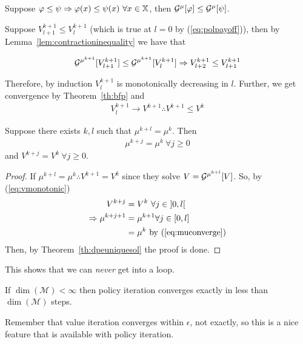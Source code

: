 \begin{lemma}%
\label{lem:contractioninequality}
Suppose $\varphi\leq\psi \Rightarrow \varphi(x)\leq\psi(x)~\forall x\in\mathbb{X}$, then $\mathcal{G}^\mu[\varphi]\leq\mathcal{G}^\mu[\psi]$.
\end{lemma}

Suppose $V_{l+1}^{k+1}\leq V_l^{k+1}$ (which is true at $l=0$ by (\ref{eq:polpayoff})), then by Lemma~\ref{lem:contractioninequality} we have that

\begin{equation*}
\mathcal{G}^{\mu^{k+1}}[V_{l+1}^{k+1}]\leq\mathcal{G}^{\mu^{k+1}}[V_l^{k+1}] \Rightarrow V_{l+2}^{k+1}\leq V_{l+1}^{k+1}
\end{equation*}

Therefore, by induction $V_l^{k+1}$ is monotonically decreasing in $l$.
Further, we get convergence by Theorem~\ref{th:bfp} and
\begin{align}
\label{eq:vmonotonic}
V_l^{k+1}\to V^{k+1} \therefore V^{k+1}\leq V^k
\end{align}

\begin{theorem}
Suppose there exists $k,l$ such that $\mu^{k+l} = \mu^k$.
Then
\begin{align}
\label{eq:muconverge}
\mu^{k+j}=\mu^k~\forall j\geq 0
\end{align}
and $V^{k+j}=V^k~\forall j\geq0$.
\end{theorem}

\begin{proof}
If $\mu^{k+l}=\mu^k \therefore V^{k+1}=V^k$ since they solve $V=\mathcal{G}^{\mu^{k+l}}[V]$.
So, by (\ref{eq:vmonotonic})
\begin{align*}
V^{k+j} &= V^k~\forall j\in \interval[open]{0}{l} \\
\Rightarrow \mu^{k+j+1} &= \mu^{k+1} \forall j\in [0,l] \\
&= \mu^k \text{~by~(\ref{eq:muconverge})}
\end{align*}
Then, by Theorem~\ref{th:dpeuniquesol} the proof is done.
\end{proof}
This shows that we can \textit{never} get into a loop.

\begin{corollary}
If $\dim(\mathcal{M})<\infty$ then policy iteration converges exactly in less than $\dim(\mathcal{M})$ steps.
\end{corollary}

Remember that value iteration converges within $\epsilon$, not exactly, so this is a nice feature that is available with policy iteration.

